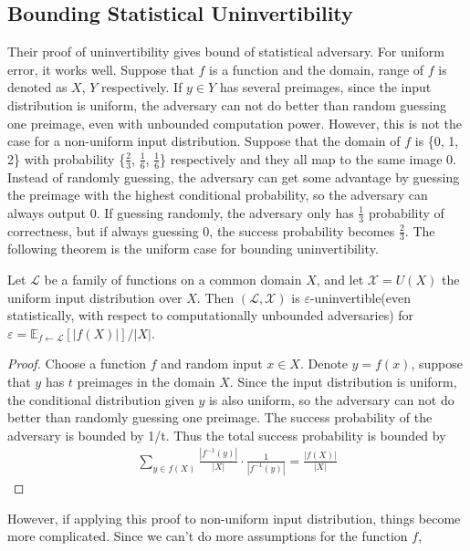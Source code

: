 \documentclass[a4paper]{article}
\theoremstyle{definition}
\theoremstyle{remark}
\renewcommand{\epsilon}{\varepsilon}
\begin{document}
\subsection{Bounding Statistical Uninvertibility}
Their proof of uninvertibility gives bound of statistical adversary. For uniform error, it works well. Suppose that $f$ is a function 
and the domain, range of $f$ is denoted as $X$, $Y$ respectively. If $y \in Y$ has several preimages, since 
the input distribution is uniform, the adversary can not do better than random guessing one preimage, even with unbounded computation
power. However, this is not the case for a non-uniform input distribution. Suppose that the domain of $f$ is \{0, 1, 2\} with 
probability \{$\frac{2}{3}$, $\frac{1}{6}$, $\frac{1}{6}$\} respectively and they all map to the same image 0. Instead of 
randomly guessing, the adversary can get some advantage by guessing the preimage with the highest conditional probability, 
so the adversary can always output 0. If guessing randomly, the adversary only has $\frac{1}{3}$ probability of correctness,
but if always guessing 0, the success probability becomes $\frac{2}{3}$.
The following theorem is the uniform case for bounding uninvertibility.
\begin{theorem}
  \label{uniformbound}
  Let $\mathcal{L}$ be a family of functions on a common domain $X$, and let $\mathcal{X} = U(X)$ the uniform input 
  distribution over $X$. Then $(\mathcal{L}, \mathcal{X})$ is $\epsilon$-uninvertible(even statistically, with respect to 
  computationally unbounded adversaries) for $\epsilon=\mathbb{E}_{f \leftarrow \mathcal{L}}[|f(X)| ] /| X |$.
    \end{theorem}
    \begin{proof}
        Choose a function $f$ and random input $x \in X$. Denote $ y = f(x)$, suppose that 
        $y$ has $t$ preimages in the domain $X$. Since the input distribution is uniform,
        the conditional distribution given $y$ is also uniform, so the adversary can not 
        do better than randomly guessing one preimage. The success probability of the adversary is bounded by 1/t.
        Thus the total success probability is bounded by
        \begin{gather*}
          \sum_{y \in f(X)} \frac{\left|f^{-1}(y)\right|}{|X|} \cdot \frac{1}{\left|f^{-1}(y)\right|}=\frac{|f(X)|}{|X|}
        \end{gather*}
    \end{proof}
However, if applying this proof to non-uniform input distribution, things become more complicated. Since we can't do 
more assumptions for the function $f$,
\end{document}
